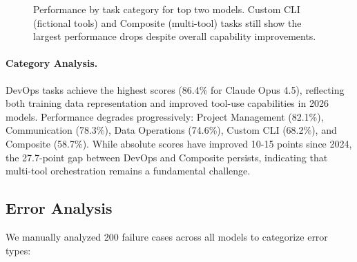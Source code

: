 \documentclass{article}
\begin{document}
\begin{figure}[h]
\centering
{}
\caption{Performance by task category for top two models. Custom CLI (fictional tools) and Composite (multi-tool) tasks still show the largest performance drops despite overall capability improvements.}
\label{fig:category}
\end{figure}

\paragraph{Category Analysis.} DevOps tasks achieve the highest scores (86.4\% for Claude Opus 4.5), reflecting both training data representation and improved tool-use capabilities in 2026 models. Performance degrades progressively: Project Management (82.1\%), Communication (78.3\%), Data Operations (74.6\%), Custom CLI (68.2\%), and Composite (58.7\%). While absolute scores have improved 10-15 points since 2024, the 27.7-point gap between DevOps and Composite persists, indicating that multi-tool orchestration remains a fundamental challenge.

\subsection{Error Analysis}

We manually analyzed 200 failure cases across all models to categorize error types:
\end{document}
